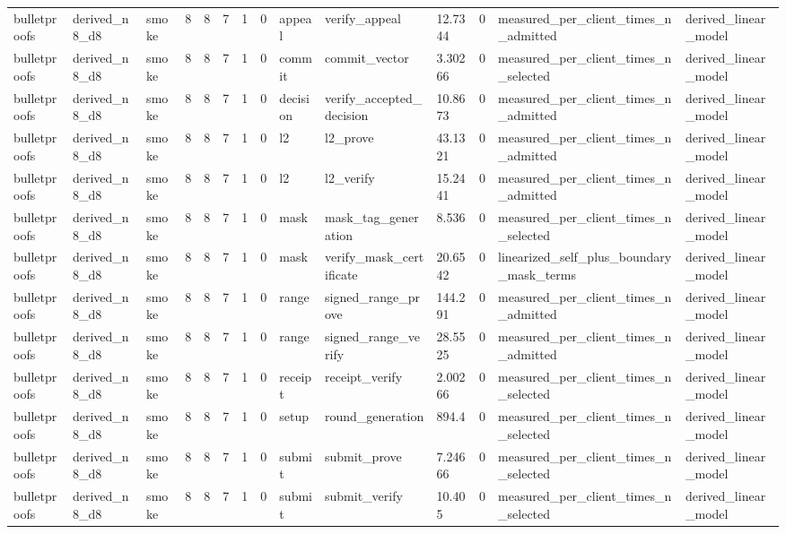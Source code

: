 \begin{table}[t]
\begin{tabular}{llllllllllllll}
bulletproofs & derived\_n8\_d8 & smoke & 8 & 8 & 7 & 1 & 0 & appeal & verify\_appeal & 12.7344 & 0 & measured\_per\_client\_times\_n\_admitted & derived\_linear\_model \\
bulletproofs & derived\_n8\_d8 & smoke & 8 & 8 & 7 & 1 & 0 & commit & commit\_vector & 3.30266 & 0 & measured\_per\_client\_times\_n\_selected & derived\_linear\_model \\
bulletproofs & derived\_n8\_d8 & smoke & 8 & 8 & 7 & 1 & 0 & decision & verify\_accepted\_decision & 10.8673 & 0 & measured\_per\_client\_times\_n\_admitted & derived\_linear\_model \\
bulletproofs & derived\_n8\_d8 & smoke & 8 & 8 & 7 & 1 & 0 & l2 & l2\_prove & 43.1321 & 0 & measured\_per\_client\_times\_n\_admitted & derived\_linear\_model \\
bulletproofs & derived\_n8\_d8 & smoke & 8 & 8 & 7 & 1 & 0 & l2 & l2\_verify & 15.2441 & 0 & measured\_per\_client\_times\_n\_admitted & derived\_linear\_model \\
bulletproofs & derived\_n8\_d8 & smoke & 8 & 8 & 7 & 1 & 0 & mask & mask\_tag\_generation & 8.536 & 0 & measured\_per\_client\_times\_n\_selected & derived\_linear\_model \\
bulletproofs & derived\_n8\_d8 & smoke & 8 & 8 & 7 & 1 & 0 & mask & verify\_mask\_certificate & 20.6542 & 0 & linearized\_self\_plus\_boundary\_mask\_terms & derived\_linear\_model \\
bulletproofs & derived\_n8\_d8 & smoke & 8 & 8 & 7 & 1 & 0 & range & signed\_range\_prove & 144.291 & 0 & measured\_per\_client\_times\_n\_admitted & derived\_linear\_model \\
bulletproofs & derived\_n8\_d8 & smoke & 8 & 8 & 7 & 1 & 0 & range & signed\_range\_verify & 28.5525 & 0 & measured\_per\_client\_times\_n\_admitted & derived\_linear\_model \\
bulletproofs & derived\_n8\_d8 & smoke & 8 & 8 & 7 & 1 & 0 & receipt & receipt\_verify & 2.00266 & 0 & measured\_per\_client\_times\_n\_selected & derived\_linear\_model \\
bulletproofs & derived\_n8\_d8 & smoke & 8 & 8 & 7 & 1 & 0 & setup & round\_generation & 894.4 & 0 & measured\_per\_client\_times\_n\_selected & derived\_linear\_model \\
bulletproofs & derived\_n8\_d8 & smoke & 8 & 8 & 7 & 1 & 0 & submit & submit\_prove & 7.24666 & 0 & measured\_per\_client\_times\_n\_selected & derived\_linear\_model \\
bulletproofs & derived\_n8\_d8 & smoke & 8 & 8 & 7 & 1 & 0 & submit & submit\_verify & 10.405 & 0 & measured\_per\_client\_times\_n\_selected & derived\_linear\_model \\

\end{tabular}
\end{table}
